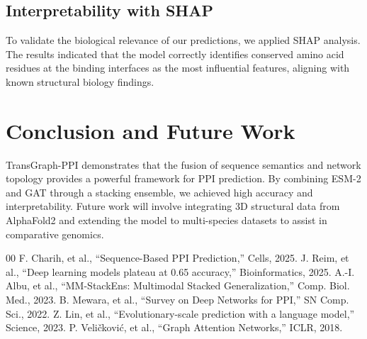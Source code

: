 \documentclass[conference]{IEEEtran}
\begin{document}
\subsection{Interpretability with SHAP}
To validate the biological relevance of our predictions, we applied SHAP analysis. The results indicated that the model correctly identifies conserved amino acid residues at the binding interfaces as the most influential features, aligning with known structural biology findings.

\section{Conclusion and Future Work}
TransGraph-PPI demonstrates that the fusion of sequence semantics and network topology provides a powerful framework for PPI prediction. By combining ESM-2 and GAT through a stacking ensemble, we achieved high accuracy and interpretability. Future work will involve integrating 3D structural data from AlphaFold2 and extending the model to multi-species datasets to assist in comparative genomics.

\begin{thebibliography}{00}
 F. Charih, et al., ``Sequence-Based PPI Prediction,'' Cells, 2025.
 J. Reim, et al., ``Deep learning models plateau at 0.65 accuracy,'' Bioinformatics, 2025.
 A.-I. Albu, et al., ``MM-StackEns: Multimodal Stacked Generalization,'' Comp. Biol. Med., 2023.
 B. Mewara, et al., ``Survey on Deep Networks for PPI,'' SN Comp. Sci., 2022.
 Z. Lin, et al., ``Evolutionary-scale prediction with a language model,'' Science, 2023.
 P. Veli\v{c}kovi\'{c}, et al., ``Graph Attention Networks,'' ICLR, 2018.
\end{thebibliography}
\end{document}
